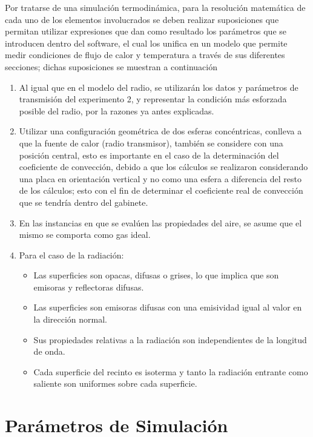 Por tratarse de una simulación termodinámica, para la resolución matemática de cada uno de los elementos involucrados se deben realizar suposiciones que permitan utilizar expresiones que dan como resultado los parámetros que se introducen dentro del software, el cual los unifica en un modelo que permite medir condiciones de flujo de calor y temperatura a través de sus diferentes secciones; dichas suposiciones se muestran a continuación

\begin{enumerate}
    \item Al igual que en el modelo del radio, se utilizarán los datos y parámetros de transmisión del experimento 2, y representar la condición más esforzada posible del radio, por la razones ya antes explicadas.
    \item Utilizar una configuración geométrica de dos esferas concéntricas, conlleva a que la fuente de calor (radio transmisor), también se considere con una posición central, esto es importante en el caso de la determinación del coeficiente de convección, debido a que los cálculos se realizaron considerando una placa en orientación vertical y no como una esfera a diferencia del resto de los cálculos; esto con el fin de determinar el coeficiente real de convección que se tendría dentro del gabinete.
    \item En las instancias en que se evalúen las propiedades del aire, se asume que el mismo se comporta como gas ideal.
    \item Para el caso de la radiación:
    \begin{itemize}
        \item Las superficies son opacas, difusas o grises, lo que implica que son emisoras y reflectoras difusas. 
        \item Las superficies son emisoras difusas con una emisividad igual al valor en la dirección normal.
        \item Sus propiedades relativas a la radiación son independientes de la longitud de onda.
        \item Cada superficie del recinto es isoterma y tanto la radiación entrante como saliente son uniformes sobre cada superficie.
        \end{itemize}
\end{enumerate}

\section{Parámetros de Simulación}

